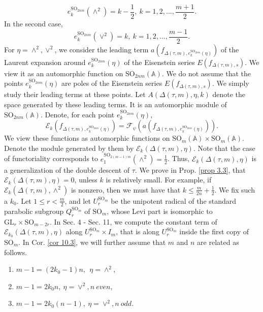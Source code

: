 \documentclass[12pts]{amsart}
\newcommand{\BA}{{\mathbb {A}}}
\newcommand{\GL}{{\mathrm{GL}}}
\newcommand{\SO}{{\mathrm{SO}}}
\begin{document}
$$
e^{\SO_{2nm}}_k(\wedge^2)=k-\frac{1}{2},\ k=1,2,...,\frac{m+1}{2}.
$$
In the second case,
$$
e^{\SO_{2nm}}_k(\vee^2)=k,\ k=1,2,...,\frac{m-1}{2}.
$$	
For $\eta=\wedge^2, \vee^2$, we consider the leading term $a(f_{\Delta(\tau,m),e^{\SO_{2nm}}_k(\eta)})$  of the Laurent expansion around $e_k^{\SO_{2nm}}(\eta)$ of the Eisenstein series $E(f_{\Delta(\tau,m),s})$. We view it as an automorphic function on $\SO_{2nm}(\BA)$. We do not assume that the points $e_k^{\SO_{2nm}}(\eta)$ are poles of the Eisenstein series $E(f_{\Delta(\tau,m),s})$. We simply study their leading terms at these points. Let $A(\Delta(\tau,m),\eta, k)$ denote the space generated by these leading terms. It is an automorphic module of $\SO_{2nm}(\BA)$. Denote, for each point $e^{\SO_{2nm}}_k(\eta)$,
$$
\mathcal{E}_k(f_{\Delta(\tau,m),e^{\SO_{2nm}}_k(\eta)})=
\mathcal{F}_\psi(a(f_{\Delta(\tau,m),e^{\SO_{2nm}}_k(\eta)})).
$$
We view these functions as automorphic functions on $\SO_m(\BA)\times \SO_m(\BA)$. Denote the module generated by them by $\mathcal{E}_k(\Delta(\tau,m),\eta)$.
Note that the case of functoriality corresponds to $e_1^{\SO_{2(m-1)m}}(\wedge^2)=\frac{1}{2}$. Thus, $\mathcal{E}_k(\Delta(\tau,m),\eta)$ is a generalization of the double descent of $\tau$. We prove in Prop. \ref{prop 3.3}, that $\mathcal{E}_k(\Delta(\tau,m),\eta)=0$, unless $k$ is relatively small. For example, if $\mathcal{E}_k(\Delta(\tau,m),\wedge^2)$ is nonzero, then we must have that $k\leq \frac{m}{2n}+\frac{1}{2}$. We fix such a $k_0$. Let $1\leq r<\frac{m}{2}$, and let $U_r^{\SO_m}$ be the unipotent radical of the standard parabolic subgroup $Q_r^{\SO_m}$ of $\SO_m$, whose Levi part is isomorphic to $\GL_r\times \SO_{m-2r}$. In Sec. 4 - Sec. 11, we compute the constant term of $\mathcal{E}_{k_0}(\Delta(\tau,m),\eta)$ along $U_r^{\SO_m}\times I_m$, that is along $U_r^{\SO_m}$ inside the first copy of $\SO_m$. In Cor. \ref{cor 10.3}, we will further assume that $m$ and $n$ are related as follows.
\begin{equation}\label{0.8}
\end{equation}
\begin{enumerate}
\item $m-1=(2k_0-1)n,\ \  \eta=\wedge^2$,\\
\item $m-1=2k_0n,\ \eta=\vee^2, n\ \textit{even}$,\\
\item $m-1=2k_0(n-1),\ \eta=\vee^2, n\ \textit{odd}$.
\end{enumerate}
 
\end{document}
